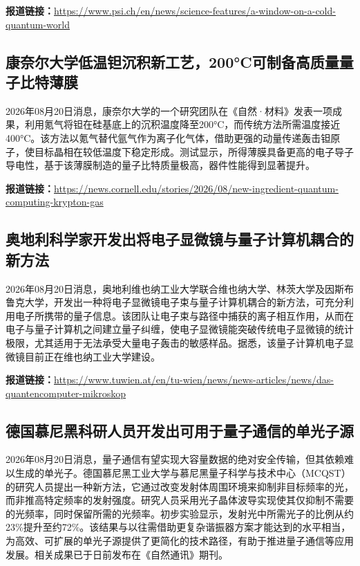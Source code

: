 \documentclass[12pt,a4paper]{ctexart}
\begin{document}
\noindent\textbf{报道链接：}\url{https://www.psi.ch/en/news/science-features/a-window-on-a-cold-quantum-world}

\subsection{ 康奈尔大学低温钽沉积新工艺，200°C可制备高质量量子比特薄膜 }

2026年08月20日消息，康奈尔大学的一个研究团队在《自然·材料》发表一项成果，利用氪气将钽在硅基底上的沉积温度降至200°C，而传统方法所需温度接近400°C。该方法以氪气替代氩气作为离子化气体，借助更强的动量传递轰击钽原子，使目标晶相在较低温度下稳定形成。测试显示，所得薄膜具备更高的电子导子导电性，基于该薄膜制造的量子比特质量极高，器件性能得到显著提升。

\noindent\textbf{报道链接：}\url{https://news.cornell.edu/stories/2026/08/new-ingredient-quantum-computing-krypton-gas}

\subsection{ 奥地利科学家开发出将电子显微镜与量子计算机耦合的新方法 }

2026年08月20日消息，奥地利维也纳工业大学联合维也纳大学、林茨大学及因斯布鲁克大学，开发出一种将电子显微镜电子束与量子计算机耦合的新方法，可充分利用电子所携带的量子信息。该团队让电子束与路径中捕获的离子相互作用，从而在电子与量子计算机之间建立量子纠缠，使电子显微镜能突破传统电子显微镜的统计极限，尤其适用于无法承受大量电子轰击的敏感样品。据悉，该量子计算机电子显微镜目前正在维也纳工业大学建设。

\noindent\textbf{报道链接：}\url{https://www.tuwien.at/en/tu-wien/news/news-articles/news/das-quantencomputer-mikroskop}

\subsection{ 德国慕尼黑科研人员开发出可用于量子通信的单光子源 }

2026年08月20日消息，量子通信有望实现大容量数据的绝对安全传输，但其依赖难以生成的单光子。德国慕尼黑工业大学与慕尼黑量子科学与技术中心（MCQST）的研究人员提出一种新方法，它通过改变发射体周围环境来抑制非目标频率的光，而非推高特定频率的发射强度。研究人员采用光子晶体波导实现使其仅抑制不需要的光频率，同时保留所需的光频率。初步实验显示，发射光中所需光子的比例从约23\%提升至约72\%。该结果与以往需借助更复杂谐振器方案才能达到的水平相当，为高效、可扩展的单光子源提供了更简化的技术路径，有助于推进量子通信等应用发展。相关成果已于日前发布在《自然通讯》期刊。
\end{document}
